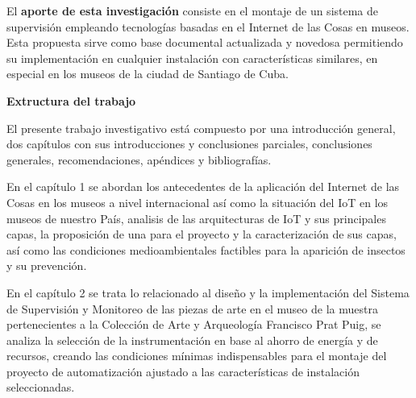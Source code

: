     El \textbf{aporte de esta investigación} consiste en el montaje de un sistema de supervisión empleando tecnologías basadas en el Internet de las Cosas en museos. Esta propuesta sirve como base documental actualizada y novedosa permitiendo su implementación en cualquier instalación con características similares, en especial en los museos de la ciudad de Santiago de Cuba.

    \textbf{Extructura del trabajo}

    El presente trabajo investigativo está compuesto por una introducción general, dos capítulos con sus introducciones y conclusiones parciales, conclusiones generales, recomendaciones, apéndices y bibliografías.

    En el capítulo 1 se abordan los antecedentes de la aplicación del Internet de las Cosas en los museos a nivel internacional así como la situación del IoT en los museos de nuestro País, analisis de las arquitecturas de IoT y sus principales capas, la proposición de una para el proyecto y la caracterización de sus capas, así como las condiciones medioambientales factibles para la aparición de insectos y su prevención.

    En el capítulo 2 se trata lo relacionado al diseño y la implementación del Sistema de Supervisión y Monitoreo de las piezas de arte en el museo de la muestra pertenecientes a la Colección de Arte y Arqueología Francisco Prat Puig, se analiza la selección de la instrumentación en base al ahorro de energía y de recursos, creando las condiciones mínimas indispensables para el montaje del proyecto de automatización ajustado a las características de instalación seleccionadas.
    